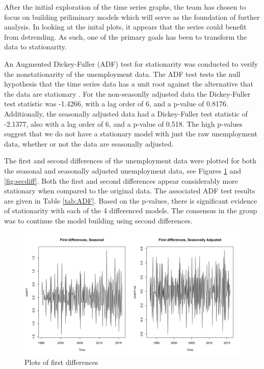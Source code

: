 {			After the initial exploration of the time series graphs, the team has chosen to focus on building priliminary models which will serve as the foundation of further analysis. In looking at the inital plots, it appears that the series could benefit from detrending. As such, one of the primary goals has been to transform the data to stationarity. \newline
			
			An Augmented Dickey-Fuller (ADF) test for stationarity was conducted to verify the nonstationarity of the unemployment data.  The ADF test tests the null hypothesis that the time series data has a unit root against the alternative that the data are stationary \citep{shumway2010time}. For the non-seasonlly adjusted data the Dickey-Fuller test statistic was -1.4266, with a lag order of 6, and a p-value of 0.8176. Additionally, the seasonally adjusted data had a Dickey-Fuller test statistic of -2.1377, also with a lag order of 6, and a p-value of 0.518. The high p-values suggest that we do not have a stationary model with just the raw unemployment data, whether or not the data are seasonally adjusted.\newline
			
		 The first and second differences of the unemployment data were plotted for both the seasonal and seasonally adjusted unemployment data, see Figures \ref{fig:firstdiff} and \ref{fig:secdiff}. Both the first and second differences appear considerably more stationary when compared to the original data. The associated ADF test results are given in Table \ref{tab:ADF}. Based on the p-values, there is significant evidence of stationarity with each of the 4 differenced models. The consensus in the group was to continue the model building using second differences.
		 
	
		 \begin{figure}[H]
							\centering
							\includegraphics[width=.6\linewidth]{images/firstdiff}
							\caption{Plots of first differences}
							\label{fig:firstdiff}
						\end{figure}
						
}
